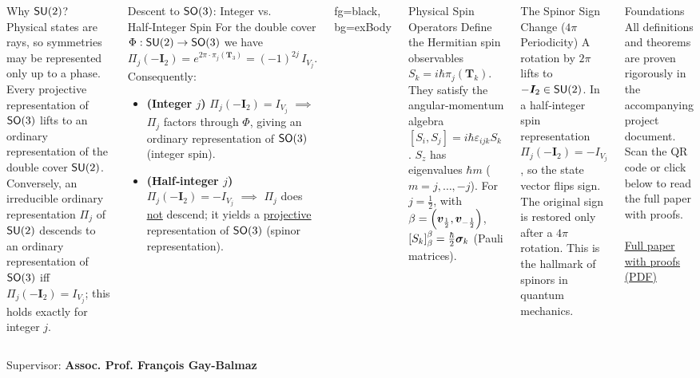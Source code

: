 \documentclass[final]{beamer}
\newenvironment{Ex}[1]
  {\begingroup
   \setbeamercolor{block title}{fg=white, bg=exTitle}
   \setbeamercolor{block body} {fg=black, bg=exBody}
   \begin{block}{#1}}
  {\end{block}
   \endgroup}
\begin{document}
\begin{frame}
\begin{columns}
\begin{alertblock}{Why $\operatorname{\mathsf{SU}}(2)$?}
Physical states are rays, so symmetries may be represented only
up to a phase.  Every projective representation of $\operatorname{\mathsf{SO}}(3)$
lifts to an ordinary representation of the double
cover $\operatorname{\mathsf{SU}}(2)$.
Conversely, an irreducible ordinary
representation $\Pi_j$ of $\operatorname{\mathsf{SU}}(2)$ descends to an ordinary
representation of $\operatorname{\mathsf{SO}}(3)$ iff $\Pi_j(-\bm I_2)=I_{V_j}$; this
holds exactly for integer $j$.
\end{alertblock}

\begin{block}{Descent to $\operatorname{\mathsf{SO}}(3)$: Integer vs. Half‑Integer Spin}
For the double cover $\Phi:\operatorname{\mathsf{SU}}(2)\to\operatorname{\mathsf{SO}}(3)$ we have
\[
\Pi_j(-\bm I_2) = e^{2\pi\cdot\pi_j(\bm T_3)}
= (-1)^{2j}\,I_{V_j}.
\]
Consequently:
\begin{itemize}
\item \textbf{(Integer $j$)}
$\Pi_j(-\bm I_2)=I_{V_j}$ $\implies$ $\Pi_j$
      factors through $\Phi$, giving an ordinary representation of $\operatorname{\mathsf{SO}}(3)$
      (integer spin).
\item \textbf{(Half‑integer $j$)} $\Pi_j(-\bm I_2)=-I_{V_j}$ $\implies$
      $\Pi_j$ does \ul{not} descend; it yields a \ul{projective}
      representation of $\operatorname{\mathsf{SO}}(3)$ (spinor representation).
\end{itemize}
\end{block}

\begin{Ex}{Physical Spin Operators}
Define the Hermitian spin observables
$
S_k = i\hbar\pi_j(\bm T_k)
$.
They satisfy the angular‑momentum algebra
$[S_i,S_j]=i\hbar\varepsilon_{ijk}S_k$.
$S_z$ has eigenvalues $\hbar m$ ($m=j,\dots,-j$).
For $j=\frac12$, with $\beta=\Br{\bm v_{\frac12},\bm v_{-\frac12}}$,
$\SqBr{S_k}_\beta^\beta
= \frac{\hbar}{2}\bm\sigma_k$ (Pauli matrices).
\end{Ex}

\begin{alertblock}{The Spinor Sign Change ($4\pi$ Periodicity)}
A rotation by $2\pi$ lifts to $-\bm I_2\in\operatorname{\mathsf{SU}}(2)$.
In a half‑integer spin representation $\Pi_j(-\bm I_2)=-I_{V_j}$, so the
state vector flips sign.  The original sign is restored only after a
$4\pi$ rotation.  This is the hallmark of spinors in quantum
mechanics.
\end{alertblock}

\begin{alertblock}{Foundations}
All definitions and theorems are proven rigorously in the accompanying
project document. Scan the QR code or click below to read the full paper
with proofs.\\[0.5em]
\centering
{}\\[0.3em]
{\footnotesize\textcolor{blue}{\href{https://raw.githubusercontent.com/ganddoffcha/quantum-spin/main/gordon-chan-quantum-spin.pdf}{Full paper with proofs (PDF)}}}
\end{alertblock}

\end{columns}

\vfill
\Large \textsf{Supervisor:} \textbf{Assoc. Prof. François Gay-Balmaz}
\end{frame}
\end{document}
